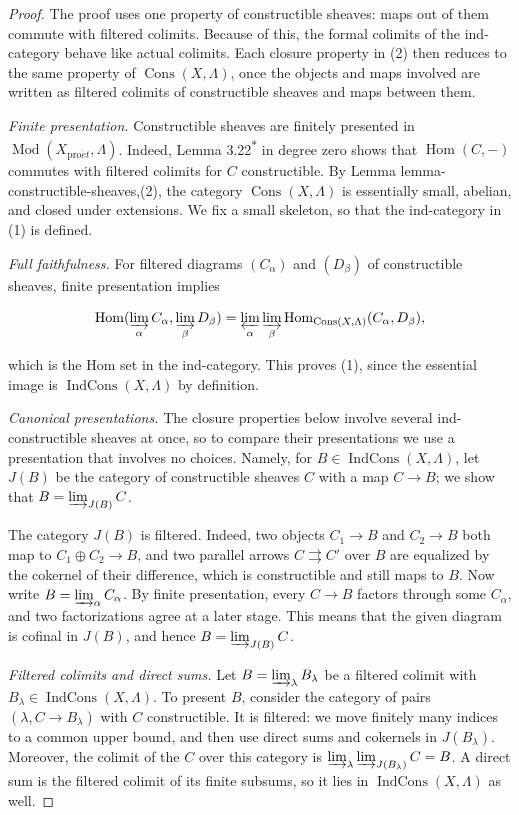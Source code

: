 \documentclass[11pt]{article}
\newcommand{\bpout}[1]{#1\textsuperscript{\hyperlink{bp-outside}{\ensuremath{\ast}}}}
\providecommand{\Cons}{}\renewcommand{\Cons}{\operatorname{Cons}}
\providecommand{\Hom}{}\renewcommand{\Hom}{\operatorname{Hom}}
\providecommand{\IndCons}{}\renewcommand{\IndCons}{\operatorname{IndCons}}
\begin{document}
\begin{proof}[{Proof}]\label{bp28}%
The proof uses one property of constructible sheaves: maps out of them commute with filtered colimits. Because of this, the formal colimits of the ind-category behave like actual colimits. Each closure property in (2) then reduces to the same property of \(\Cons(X,\Lambda)\), once the objects and maps involved are written as filtered colimits of constructible sheaves and maps between them.

\emph{Finite presentation.} Constructible sheaves are finitely presented in \(\operatorname{Mod}(X_{\mathrm{pro}\acute{e}t},\Lambda)\). Indeed, Lemma \bpout{3.22} in degree zero shows that \(\Hom(C,-)\) commutes with filtered colimits for \(C\) constructible. By Lemma lemma-constructible-sheaves,(2), the category \(\Cons(X,\Lambda)\) is essentially small, abelian, and closed under extensions. We fix a small skeleton, so that the ind-category in (1) is defined.

\emph{Full faithfulness.} For filtered diagrams \((C_\alpha)\) and \((D_\beta)\) of constructible sheaves, finite presentation implies

\[
\Hom(\varinjlim_\alpha C_\alpha,\varinjlim_\beta D_\beta)
=\varprojlim_\alpha\varinjlim_\beta\Hom_{\Cons(X,\Lambda)}(C_\alpha,D_\beta),
\]

which is the Hom set in the ind-category. This proves (1), since the essential image is \(\IndCons(X,\Lambda)\) by definition.

\emph{Canonical presentations.} The closure properties below involve several ind-constructible sheaves at once, so to compare their presentations we use a presentation that involves no choices. Namely, for \(B\in\IndCons(X,\Lambda)\), let \(J(B)\) be the category of constructible sheaves \(C\) with a map \(C\to B\); we show that \(B=\varinjlim_{J(B)}C\).

The category \(J(B)\) is filtered. Indeed, two objects \(C_1\to B\) and \(C_2\to B\) both map to \(C_1\oplus C_2\to B\), and two parallel arrows \(C\rightrightarrows C'\) over \(B\) are equalized by the cokernel of their difference, which is constructible and still maps to \(B\). Now write \(B=\varinjlim_\alpha C_\alpha\). By finite presentation, every \(C\to B\) factors through some \(C_\alpha\), and two factorizations agree at a later stage. This means that the given diagram is cofinal in \(J(B)\), and hence \(B=\varinjlim_{J(B)}C\).

\emph{Filtered colimits and direct sums.} Let \(B=\varinjlim_\lambda B_\lambda\) be a filtered colimit with \(B_\lambda\in\IndCons(X,\Lambda)\). To present \(B\), consider the category of pairs \((\lambda,C\to B_\lambda)\) with \(C\) constructible. It is filtered: we move finitely many indices to a common upper bound, and then use direct sums and cokernels in \(J(B_\lambda)\). Moreover, the colimit of the \(C\) over this category is \(\varinjlim_\lambda\varinjlim_{J(B_\lambda)}C=B\). A direct sum is the filtered colimit of its finite subsums, so it lies in \(\IndCons(X,\Lambda)\) as well.


\end{proof}
\end{document}
